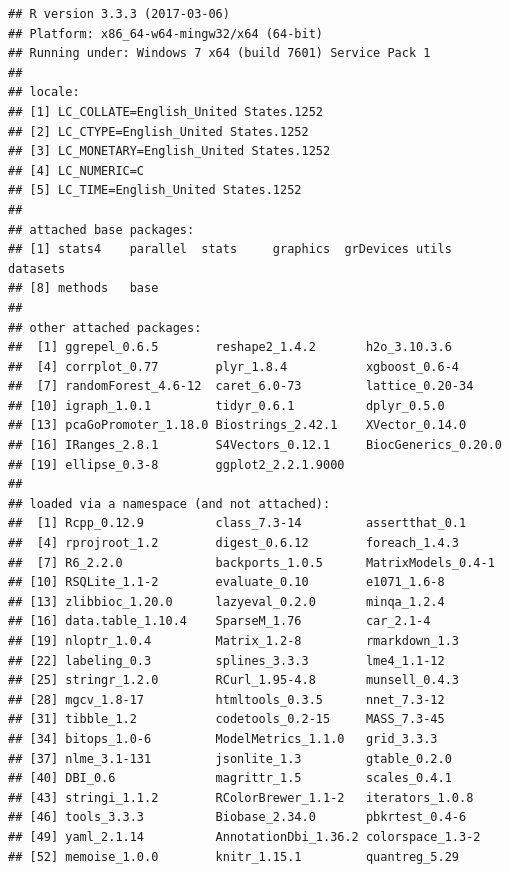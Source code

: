 \documentclass[]{article}
\begin{document}
\begin{verbatim}
## R version 3.3.3 (2017-03-06)
## Platform: x86_64-w64-mingw32/x64 (64-bit)
## Running under: Windows 7 x64 (build 7601) Service Pack 1
## 
## locale:
## [1] LC_COLLATE=English_United States.1252 
## [2] LC_CTYPE=English_United States.1252   
## [3] LC_MONETARY=English_United States.1252
## [4] LC_NUMERIC=C                          
## [5] LC_TIME=English_United States.1252    
## 
## attached base packages:
## [1] stats4    parallel  stats     graphics  grDevices utils     datasets 
## [8] methods   base     
## 
## other attached packages:
##  [1] ggrepel_0.6.5        reshape2_1.4.2       h2o_3.10.3.6        
##  [4] corrplot_0.77        plyr_1.8.4           xgboost_0.6-4       
##  [7] randomForest_4.6-12  caret_6.0-73         lattice_0.20-34     
## [10] igraph_1.0.1         tidyr_0.6.1          dplyr_0.5.0         
## [13] pcaGoPromoter_1.18.0 Biostrings_2.42.1    XVector_0.14.0      
## [16] IRanges_2.8.1        S4Vectors_0.12.1     BiocGenerics_0.20.0 
## [19] ellipse_0.3-8        ggplot2_2.2.1.9000  
## 
## loaded via a namespace (and not attached):
##  [1] Rcpp_0.12.9          class_7.3-14         assertthat_0.1      
##  [4] rprojroot_1.2        digest_0.6.12        foreach_1.4.3       
##  [7] R6_2.2.0             backports_1.0.5      MatrixModels_0.4-1  
## [10] RSQLite_1.1-2        evaluate_0.10        e1071_1.6-8         
## [13] zlibbioc_1.20.0      lazyeval_0.2.0       minqa_1.2.4         
## [16] data.table_1.10.4    SparseM_1.76         car_2.1-4           
## [19] nloptr_1.0.4         Matrix_1.2-8         rmarkdown_1.3       
## [22] labeling_0.3         splines_3.3.3        lme4_1.1-12         
## [25] stringr_1.2.0        RCurl_1.95-4.8       munsell_0.4.3       
## [28] mgcv_1.8-17          htmltools_0.3.5      nnet_7.3-12         
## [31] tibble_1.2           codetools_0.2-15     MASS_7.3-45         
## [34] bitops_1.0-6         ModelMetrics_1.1.0   grid_3.3.3          
## [37] nlme_3.1-131         jsonlite_1.3         gtable_0.2.0        
## [40] DBI_0.6              magrittr_1.5         scales_0.4.1        
## [43] stringi_1.1.2        RColorBrewer_1.1-2   iterators_1.0.8     
## [46] tools_3.3.3          Biobase_2.34.0       pbkrtest_0.4-6      
## [49] yaml_2.1.14          AnnotationDbi_1.36.2 colorspace_1.3-2    
## [52] memoise_1.0.0        knitr_1.15.1         quantreg_5.29
\end{verbatim}
\end{document}
